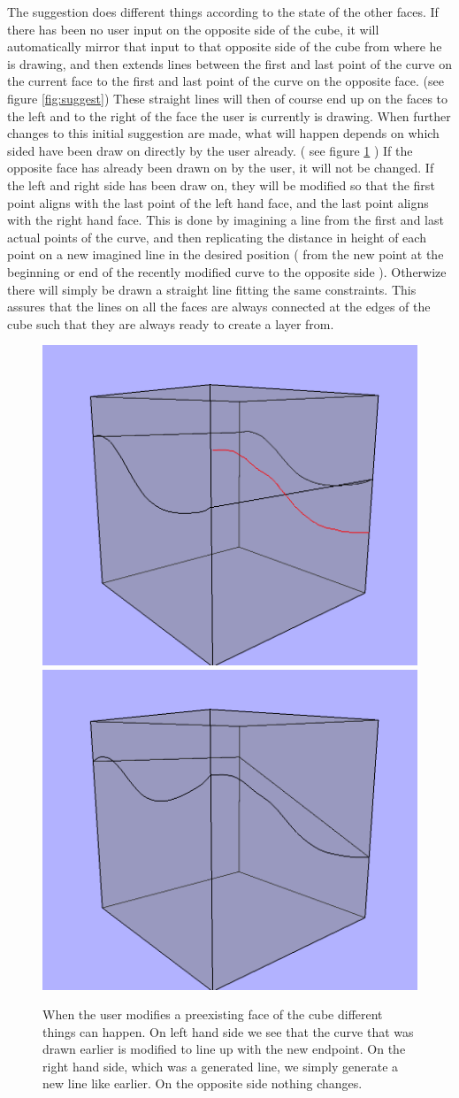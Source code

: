 \documentclass[a4paper,12pt]{report}
\begin{document}
The suggestion does different things according to the state of the other faces. If there has been no user input on the opposite side of the cube, it will automatically mirror that input to that opposite side of the cube from where he is drawing, and then extends lines between the first and last point of the curve on the current face to the first and last point of the curve on the opposite face. (see figure \ref{fig:suggest}) These straight lines will then of course end up on the faces to the left and to the right of the face the user is currently is drawing. When further changes to this initial suggestion are made, what will happen depends on which sided have been draw on directly by the user already. ( see figure \ref{fig:layerModify} ) If the opposite face has already been drawn on by the user, it will not be changed. If the left and right side has been draw on, they will be modified so that the first point aligns with the last point of the left hand face, and the last point aligns with the right hand face.
 This is done by imagining a line from the first and last actual points of the curve, and then replicating the distance in height of each point on a new imagined line in the desired position ( from the new point at the beginning or end of the recently modified curve to the opposite side ). Otherwize there will simply be drawn a straight line fitting the same 
constraints. This assures that the lines on all the faces are always connected at the edges of the cube such that they are always ready to create a layer from.

\begin{figure}
\includegraphics[width=.5\linewidth]{thesis/modification1.png}
\includegraphics[width=.5\linewidth]{thesis/modification2.png}
 \caption{When the user modifies a preexisting face of the cube different things can happen. On left hand side we see that the curve that was drawn earlier is modified to line up with the new endpoint. On the right hand side, which was a generated line, we simply generate a new line like earlier. On the opposite side nothing changes.}
 \label{fig:layerModify}
\end{figure}
\end{document}

